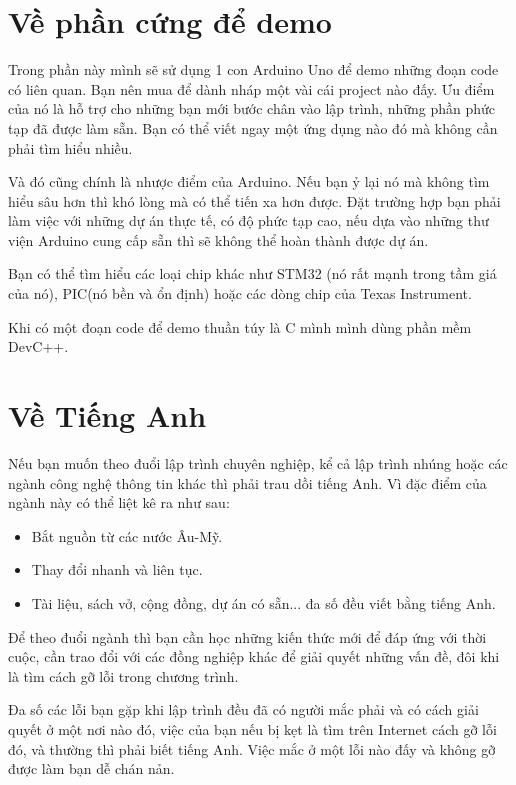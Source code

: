 \section{Về phần cứng để demo}

Trong phần này mình sẽ sử dụng 1 con Arduino Uno để demo những đoạn code có liên quan. Bạn nên mua để dành nháp một vài cái project nào đấy. Ưu điểm của nó là hỗ trợ cho những bạn mới bước chân vào lập trình, những phần phức tạp đã được làm sẵn. Bạn có thể viết ngay một ứng dụng nào đó mà không cần phải tìm hiểu nhiều.

Và đó cũng chính là nhược điểm của Arduino. Nếu bạn ỷ lại nó mà không tìm hiểu sâu hơn thì khó lòng mà có thể tiến xa hơn được. Đặt trường hợp bạn phải làm việc với những dự án thực tế, có độ phức tạp cao, nếu dựa vào những thư viện Arduino cung cấp sẵn thì sẽ không thể hoàn thành được dự án.

Bạn có thể tìm hiểu các loại chip khác như STM32 (nó rất mạnh trong tầm giá của nó), PIC(nó bền và ổn định) hoặc các dòng chip của Texas Instrument. 

Khi có một đoạn code để demo thuần túy là C mình mình dùng phần mềm DevC++.

\section{Về Tiếng Anh}
    
Nếu bạn muốn theo đuổi lập trình chuyên nghiệp, kể cả lập trình nhúng hoặc các ngành công nghệ thông tin khác thì phải trau dồi tiếng Anh. Vì đặc điểm của ngành này có thể liệt kê ra như sau:

\begin{itemize}
    \item Bắt nguồn từ các nước Âu-Mỹ.
    \item Thay đổi nhanh và liên tục.
    \item Tài liệu, sách vở, cộng đồng, dự án có sẵn... đa số đều viết bằng tiếng Anh.
\end{itemize}

Để theo đuổi ngành thì bạn cần học những kiến thức mới để đáp ứng với thời cuộc, cần trao đổi với các đồng nghiệp khác để giải quyết những vấn đề, đôi khi là tìm cách gỡ lỗi trong chương trình.

Đa số các lỗi bạn gặp khi lập trình đều đã có người mắc phải và có cách giải quyết ở một nơi nào đó, việc của bạn nếu bị kẹt là tìm trên Internet cách gỡ lỗi đó, và thường thì phải biết tiếng Anh. Việc mắc ở một lỗi nào đấy và không gỡ được làm bạn dễ chán nản.

